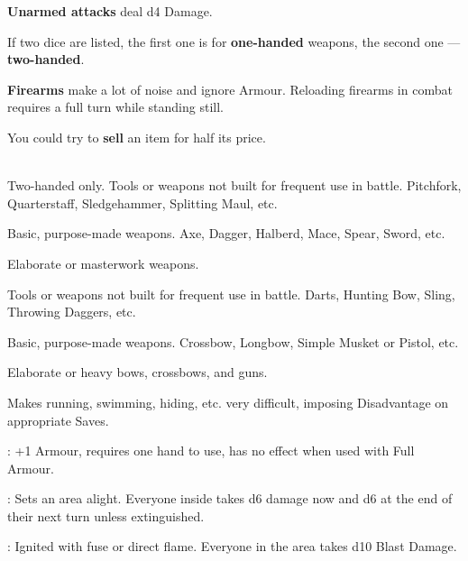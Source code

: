 \documentclass[itdr]{subfiles}
\begin{document}
\textbf{Unarmed attacks} deal d4 Damage.

If two dice are listed, the first one is for \textbf{one-handed} weapons, the second one --- \textbf{two-handed}.

\textbf{Firearms} make a lot of noise and ignore Armour. Reloading firearms in combat requires a full turn while standing still.

You could try to \textbf{sell} an item for half its price.



\\Two-handed only. Tools or weapons not built for frequent use in battle. Pitchfork, Quarterstaff, Sledgehammer, Splitting Maul, etc.

 Basic, purpose-made weapons. Axe, Dagger, Halberd, Mace, Spear, Sword, etc.

 Elaborate or masterwork weapons.



 Tools or weapons not built for frequent use in battle. Darts, Hunting Bow, Sling, Throwing Daggers, etc.

 Basic, purpose-made weapons. Crossbow, Longbow, Simple Musket or Pistol, etc.

 Elaborate or heavy bows, crossbows, and guns.




 Makes running, swimming, hiding, etc. very difficult, imposing Disadvantage on appropriate Saves.

: +1 Armour, requires one hand to use, has no effect when used with Full Armour.



: Sets an area alight. Everyone inside takes d6 damage now and d6 at the end of their next turn unless extinguished.

: Ignited with fuse or direct flame. Everyone in the area takes d10 Blast Damage.
\end{document}
